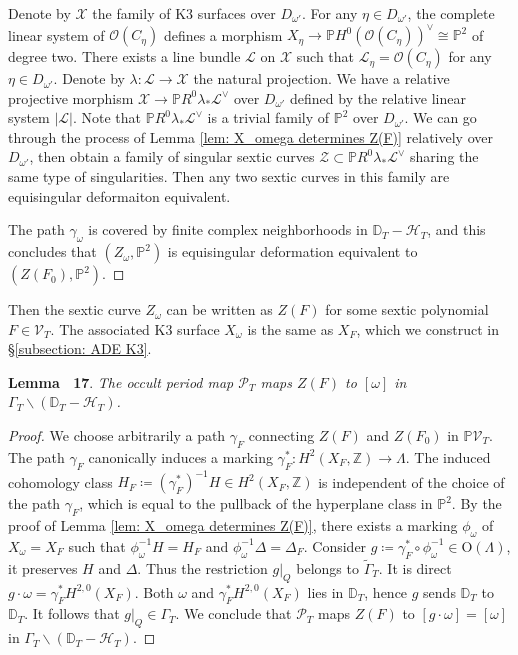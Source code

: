 \documentclass[
]{article}
\begin{document}
Denote by \(\mathcal{X}\) the family of K3 surfaces over
\(D_{\omega'}\). For any \(\eta\in D_{\omega'}\), the complete linear
system of \(\mathcal{O}(C_\eta)\) defines a morphism
\(X_\eta\to \mathbb{P} H^0(\mathcal{O}(C_\eta))^\vee\cong\mathbb{P}^2\)
of degree two. There exists a line bundle \(\mathcal{L}\) on
\(\mathcal{X}\) such that \(\mathcal{L}_\eta=\mathcal{O}(C_\eta)\) for
any \(\eta\in D_{\omega'}\). Denote by
\(\lambda\colon \mathcal{L}\to\mathcal{X}\) the natural projection. We
have a relative projective morphism
\(\mathcal{X}\to \mathbb{P} R^0\lambda_*\mathcal{L}^\vee\) over
\(D_{\omega'}\) defined by the relative linear system \(|\mathcal{L}|\).
Note that \(\mathbb{P} R^0\lambda_*\mathcal{L}^\vee\) is a trivial
family of \(\mathbb{P}^2\) over \(D_{\omega'}\). We can go through the
process of Lemma \ref{lem: X_omega determines Z(F)} relatively over
\(D_{\omega'}\), then obtain a family of singular sextic curves
\(\mathcal{Z}\subset \mathbb{P} R^0\lambda_*\mathcal{L}^\vee\) sharing
the same type of singularities. Then any two sextic curves in this
family are equisingular deformaiton equivalent.

The path \(\gamma_\omega\) is covered by finite complex neighborhoods in
\(\mathbb{D}_T-\mathcal{H}_T\), and this concludes that
\((Z_\omega,\mathbb{P}^2)\) is equisingular deformation equivalent to
\((Z(F_0),\mathbb{P}^2)\).~◻

Then the sextic curve \(Z_\omega\) can be written as \(Z(F)\) for some
sextic polynomial \(F\in\mathcal{V}_T\). The associated K3 surface
\(X_\omega\) is the same as \(X_F\), which we construct in
§\ref{subsection: ADE K3}.

\textbf{Lemma~ 17}.
\emph{\label{lem: Prd_T coincides with global period map} The occult
period map \(\mathscr{P}_T\) maps \(Z(F)\) to \([\omega]\) in
\(\Gamma_T\backslash (\mathbb{D}_T-\mathcal{H}_T)\).}

\emph{Proof.} We choose arbitrarily a path \(\gamma_F\) connecting
\(Z(F)\) and \(Z(F_0)\) in \(\mathbb{P}\mathcal{V}_T\). The path
\(\gamma_F\) canonically induces a marking
\(\gamma_F^*\colon H^2(X_F,\mathbb{Z})\to\Lambda\). The induced
cohomology class
\(H_F\coloneqq (\gamma_F^*)^{-1} H\in H^2(X_F,\mathbb{Z})\) is
independent of the choice of the path \(\gamma_F\), which is equal to
the pullback of the hyperplane class in \(\mathbb{P}^2\). By the proof
of Lemma \ref{lem: X_omega determines Z(F)}, there exists a marking
\(\phi_\omega\) of \(X_\omega=X_F\) such that
\(\phi_\omega^{-1} H = H_F\) and \(\phi_\omega^{-1} \Delta = \Delta_F\).
Consider
\(g\coloneqq \gamma_F^*\circ \phi_\omega^{-1}\in \mathrm{O}(\Lambda)\),
it preserves \(H\) and \(\Delta\). Thus the restriction \(g|_Q\) belongs
to \(\widetilde{\Gamma}_T\). It is direct
\(g\cdot\omega = \gamma_F^* H^{2,0}(X_F)\). Both \(\omega\) and
\(\gamma_F^* H^{2,0}(X_F)\) lies in \(\mathbb{D}_T\), hence \(g\) sends
\(\mathbb{D}_T\) to \(\mathbb{D}_T\). It follows that
\(g|_Q\in \Gamma_T\). We conclude that \(\mathscr{P}_T\) maps \(Z(F)\)
to \([g\cdot\omega]=[\omega]\) in
\(\Gamma_T\backslash (\mathbb{D}_T-\mathcal{H}_T)\).~◻
\end{document}
